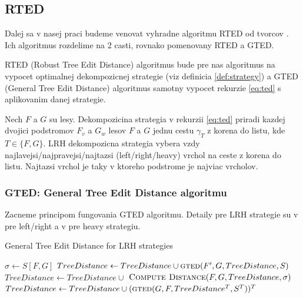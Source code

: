 \subsection{RTED}

Dalej sa v nasej praci budeme venovat vyhradne algoritmu RTED od tvorcov \citet{RTED}.
Ich algoritmus rozdelime na 2 casti, rovnako pomenovany RTED a GTED.

RTED (Robust Tree Edit Distance) algoritmus bude pre nas algoritmus na vypocet
optimalnej dekompozicnej strategie (viz definicia \ref{def:strategy})
a GTED (General Tree Edit Distance) algoritmus samotny vypocet rekurzie \ref{eq:ted}
s aplikovanim danej strategie.

\begin{definice}\label{def:strategy}
	Nech $F$ a $G$ su lesy. Dekompozicina strategia v rekurzii \ref{eq:ted} priradi
  kazdej dvojici podstromov $F_{v}$ a $G_{w}$ lesov $F$ a $G$ jednu cestu $\gamma_{T}$
  z korena do listu, kde $T \in \{F, G\}$.
	LRH dekompozicna strategia vybera vzdy najlavejsi/najpravejsi/najtazsi
	(left/right/heavy) vrchol na ceste z korena do listu. Najtazsi vrchol je taky
	v ktoreho podstrome je najviac vrcholov. 
\end{definice}

\subsubsection{GTED: General Tree Edit Distance algoritmu}

Zacneme principom fungovania GTED algoritmu. Detaily pre LRH strategie su
v \citet{ZHANGSHASHA} pre left/right a v \citet{DMRW} pre heavy strategiu.

\begin{algorithm}
  \caption{General Tree Edit Distance for LRH strategies}
  \label{alg:gted}
  \begin{algorithmic}[1]
      \State $\sigma \gets S[F, G]$
          \State $TreeDistance \gets TreeDistance \cup \Call{gted}{F', G, TreeDistance, S}$
        \EndFor
        \State $TreeDistance \gets TreeDistance \cup$
        \Indent
          \State $\Call{Compute Distance}{F, G, TreeDistance, \sigma}$
        \EndIndent
      \Else
        \State $TreeDistance \gets TreeDistance \cup (\Call{gted}{G, F, TreeDistance^{T}, S^{T}})^{T}$
      \EndIf
      \State {}
    \EndProcedure
  \end{algorithmic}
\end{algorithm}

